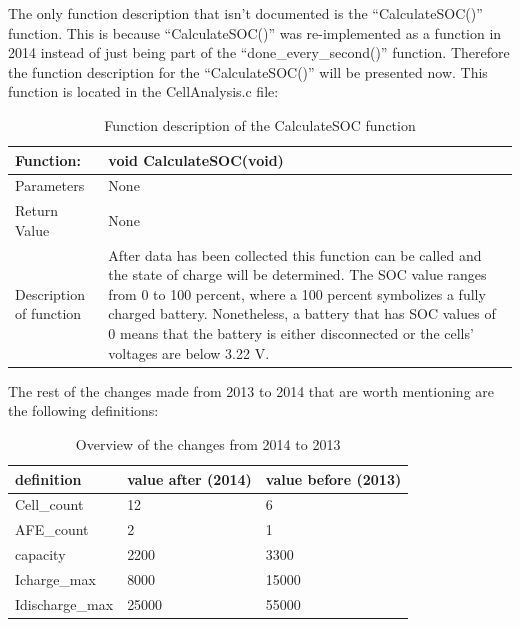 The only function description that isn’t documented is the “CalculateSOC()” function. This is because “CalculateSOC()” was re-implemented as a function in 2014 instead of just being part of the “done\_every\_second()” function. Therefore the function description for the “CalculateSOC()” will be presented now. This function is located in the CellAnalysis.c file:
\begin{table}[h!]
	\centering
	\label{CalculateSOCfunction}
	\begin{tabular}{|p{4 cm}|p{9 cm}|}
		\hline
		\textbf{Function:} & \textbf{void CalculateSOC(void)}	\\\hline
		Parameters	& None	\\\hline
		Return Value	& None	\\\hline
		Description of function	& After data has been collected this function can be called and the state of charge will be determined. The SOC value ranges from 0 to 100 percent, where a 100 percent symbolizes a fully charged battery. Nonetheless, a battery that has SOC values of 0 means that the battery is either disconnected or the cells' voltages are below 3.22 V. \\\hline
	\end{tabular}
	\caption{Function description of the CalculateSOC function}
\end{table}

The rest of the changes made from 2013 to 2014 that are worth mentioning are the following definitions:\\
\begin{table}[h!]
	\centering
	\label{changedDefines}
	\begin{tabular}{|p{4 cm}|p{4 cm}|p{4 cm}|}
		\hline
		\textbf{definition} & \textbf{value after (2014)}	& \textbf{value before (2013)}	\\\hline
		Cell\_count	& 12	& 6	\\\hline
		AFE\_count	& 2	& 1	\\\hline
		capacity	& 2200	& 3300	\\\hline
		Icharge\_max	& 8000	& 15000	\\\hline
		Idischarge\_max	& 25000	& 55000	\\\hline
	\end{tabular}
	\caption{Overview of the changes from 2014 to 2013}
\end{table}

